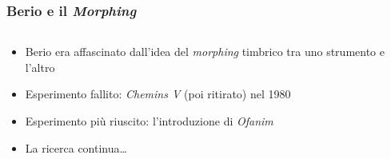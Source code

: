 \begin{frame}
    \frametitle<+- | alert@+->{Berio e il \emph{Morphing}}

    \begin{columns}[T]
        \begin{column}{0.7\textwidth}
            \begin{itemize}[<+- | alert@+->]
                \item Berio era affascinato dall'idea del \emph{morphing}
                    timbrico tra uno strumento e l'altro
                \item Esperimento fallito: \emph{Chemins V} (poi ritirato) nel 1980
                \item Esperimento pi\`u riuscito: l'introduzione di \emph{Ofanim}
                \item La ricerca continua\dots
            \end{itemize}
        \end{column}
        \begin{column}{0.3\textwidth}
        \end{column}
    \end{columns}

\end{frame}

